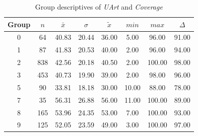 \begin{table}[ht]
	\small
	\centering
	\begin{tabular}{c|c|c|c|c|c|c|c}
		\toprule
		Group & $n$ & $\bar{x}$ & $\sigma$ & $\tilde{x}$ & $min$ & $max$ & $\Delta$ \\ 
		\midrule
		0 & 64 & 40.83 & 20.44 & 36.00 & 5.00 & 96.00 & 91.00 \\ 
		1 & 87 & 41.83 & 20.53 & 40.00 & 2.00 & 96.00 & 94.00 \\ 
		2 & 838 & 42.56 & 20.18 & 40.50 & 2.00 & 100.00 & 98.00 \\ 
		3 & 453 & 40.73 & 19.90 & 39.00 & 2.00 & 98.00 & 96.00 \\ 
		5 & 90 & 33.81 & 18.18 & 30.00 & 10.00 & 88.00 & 78.00 \\ 
		7 & 35 & 56.31 & 26.88 & 56.00 & 11.00 & 100.00 & 89.00 \\ 
		8 & 165 & 53.96 & 24.35 & 53.00 & 7.00 & 100.00 & 93.00 \\ 
		9 & 125 & 52.05 & 23.59 & 49.00 & 3.00 & 100.00 & 97.00 \\ 
		\bottomrule
	\end{tabular}
	\caption{Group descriptives of \textit{UArt} and \textit{Coverage}}
	\label{tbl:descriptives_baysis_matched_UArt_Cov}
\end{table}

